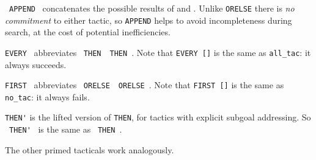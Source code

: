 \begin{isabellebody}
\begin{isamarkuptext}
\begin{description}
  \item {}~\verb|APPEND|~ concatenates the
  possible results of  and .  Unlike
  \verb|ORELSE| there is \emph{no commitment} to either tactic, so
  \verb|APPEND| helps to avoid incompleteness during search, at
  the cost of potential inefficiencies.

  \item \verb|EVERY|~ abbreviates ~\verb|THEN|~~\verb|THEN|~.
  Note that \verb|EVERY []| is the same as \verb|all_tac|: it always
  succeeds.

  \item \verb|FIRST|~ abbreviates ~\verb|ORELSE|~~\verb|ORELSE|~.  Note that \verb|FIRST []| is the same as \verb|no_tac|: it
  always fails.

  \item \verb|THEN'| is the lifted version of \verb|THEN|, for
  tactics with explicit subgoal addressing.  So ~\verb|THEN'|~ is the same as ~\verb|THEN|~.

  The other primed tacticals work analogously.


\end{description}
\end{isamarkuptext}
\end{isabellebody}
